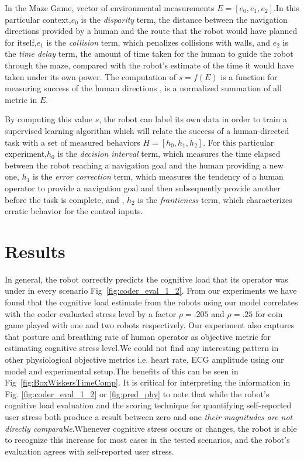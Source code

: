 \documentclass{sig-alternate}
\begin{document}
In the Maze Game,  vector of environmental measurements $E = [e_0, e_1, e_2]$.In this particular context,$e_0$ is the
\emph{disparity} term, the distance between the navigation directions provided by a human and the route that the robot
would have planned for itself,$e_1$ is the \emph{collision} term, which penalizes collisions with walls, and $e_2$ is
the \emph{time delay} term, the amount of time taken for the human to guide the robot through the maze, compared with
the robot's estimate of the time it would have taken under its own power. The computation of $s = f(E)$ is a function
for measuring success of the human directions , is a normalized summation of all metric in $E$.

By computing this value $s$, the robot can label its own data in order to train a supervised learning algorithm which
will relate the success of a human-directed task with a set of measured behaviors $H = [h_0, h_1, h_2]$. For this particular experiment,$h_0$ is the \emph{decision interval}
term, which measures the time elapsed between the robot reaching a navigation goal and the human providing a new one,
$h_1$ is the \emph{error correction} term, which measures the tendency of a human operator to provide a navigation goal
and then subsequently provide another before the task is complete, and , $h_2$ is the \emph{franticness} term, which
characterizes erratic behavior for the control inputs.

\section{Results} In general, the robot correctly predicts the cognitive load that its operator was under in every
scenario Fig~\ref{fig:coder_eval_1_2}. From our experiments we
have found that the cognitive load estimate from the robots using our model correlates with the coder evaluated stress
level by a factor $\rho=.205$ and $\rho=.25$ for coin game played with one and two robots respectively. Our experiment
also captures that posture and breathing rate of human operator as objective metric for estimating cognitive stress
level.We could not find any interesting pattern in other physiological objective metrics i.e. heart rate, ECG amplitude
using our model and experimental setup.The benefits of this can be seen in Fig~\ref{fig:BoxWiskersTimeComp}.  It is critical for interpreting the information in
Fig. \ref{fig:coder_eval_1_2} or \ref{fig:pred_phy} to note that while the robot's cognitive load evaluation and the
scoring technique for quantifying self-reported user stress both produce a result between zero and one \textit{their
magnitudes are not directly comparable}.Whenever cognitive stress occurs or changes, the robot is able to recognize this
increase for most cases in the tested scenarios, and the robot's evaluation agrees with self-reported user stress.
\end{document}
